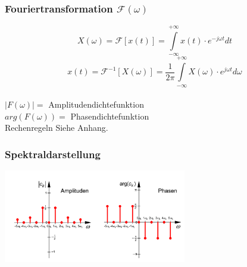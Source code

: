 \begin{multicols}{2}

  \subsubsection*{Fouriertransformation $\mathcal{F}(\omega)$}
  $$ X(\omega) = \mathcal{F}[x(t)] = \int \limits _{-\infty} ^{+\infty} x(t) \cdot e^{-j \omega t} dt $$
  $$ x(t) = \mathcal{F}^{-1}[X(\omega)] = \frac{1}{2 \pi} \int \limits _{- \infty} ^{+ \infty} X(\omega) \cdot e^{j \omega t} d\omega$$
  \\$\left|F(\omega)\right| =$ Amplitudendichtefunktion
    \\$arg(F(\omega)) =$ Phasendichtefunktion
\\ Rechenregeln Siehe Anhang.


  \subsubsection*{Spektraldarstellung}
  \includegraphics[width = 8cm]{include/Integraltransformationen/img/Spektrum.png}
\end{multicols}


